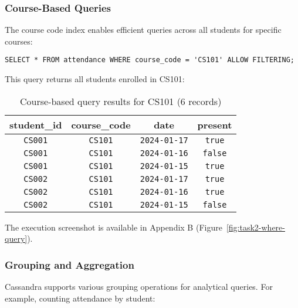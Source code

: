 \subsubsection{Course-Based Queries}
The course code index enables efficient queries across all students for specific courses:

\begin{verbatim}
SELECT * FROM attendance WHERE course_code = 'CS101' ALLOW FILTERING;
\end{verbatim}

This query returns all students enrolled in CS101:

\begin{table}[H]
  \centering
  \footnotesize
  \begin{tabular}{|c|c|c|c|}
    \hline
    \textbf{student\_id} & \textbf{course\_code} & \textbf{date} & \textbf{present} \\
    \hline
    \texttt{CS001}                & \texttt{CS101}                 & \texttt{2024-01-17}    & \texttt{true}             \\
    \texttt{CS001}                & \texttt{CS101}                 & \texttt{2024-01-16}    & \texttt{false}            \\
    \texttt{CS001}                & \texttt{CS101}                 & \texttt{2024-01-15}    & \texttt{true}             \\
    \texttt{CS002}                & \texttt{CS101}                 & \texttt{2024-01-17}    & \texttt{true}             \\
    \texttt{CS002}                & \texttt{CS101}                 & \texttt{2024-01-16}    & \texttt{true}             \\
    \texttt{CS002}                & \texttt{CS101}                 & \texttt{2024-01-15}    & \texttt{false}            \\
    \hline
  \end{tabular}
  \caption{Course-based query results for CS101 (6 records)}
\end{table}

The execution screenshot is available in Appendix B (Figure~\ref{fig:task2-where-query}).

\subsubsection{Grouping and Aggregation}
Cassandra supports various grouping operations for analytical queries. For example, counting attendance by student:

